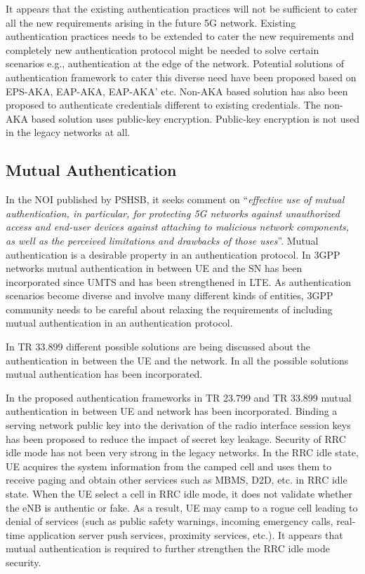 \documentclass[12pt]{llncs}
\newcommand\ques[1]{``\emph{#1}''}
\begin{document}
It appears that the existing authentication practices will not be sufficient to cater all the new requirements arising in the future 5G network. Existing authentication practices needs to be extended to cater the new requirements and completely new authentication protocol might be needed to solve certain scenarios e.g., authentication at the edge of the network. Potential solutions of authentication framework to cater this diverse need have been proposed based on EPS-AKA, EAP-AKA, EAP-AKA' etc. Non-AKA based solution has also been proposed to authenticate credentials different to existing credentials. The non-AKA based solution uses public-key encryption. Public-key encryption is not used in the legacy networks at all.  

\subsection{Mutual Authentication}
In the NOI published by PSHSB, it seeks comment on \ques{effective use of mutual authentication, in particular, for protecting 5G networks against unauthorized access and end-user devices against attaching to malicious network components, as well as the perceived limitations and drawbacks of those uses}. Mutual authentication is a desirable property in an authentication protocol. In 3GPP networks mutual authentication in between UE and the SN has been incorporated since UMTS and has been strengthened in LTE. As authentication scenarios become diverse and involve many different kinds of entities, 3GPP community needs to be careful about relaxing the requirements of including mutual authentication in an authentication protocol. 

In TR 33.899 different possible solutions are being discussed about the authentication in between the UE and the network. In all the possible solutions mutual authentication has been incorporated. 

In the proposed authentication frameworks in TR 23.799 and TR 33.899 mutual authentication in between UE and network has been incorporated. Binding a serving network public key into the derivation of the radio interface session keys has been proposed to reduce the impact of secret key leakage. Security of RRC idle mode has not been very strong in the legacy networks. In the RRC idle state, UE acquires the system information from the camped cell and uses them to receive paging and obtain other services such as MBMS, D2D, etc. in RRC idle state. When the UE select a cell in RRC idle mode, it does not validate whether the eNB is authentic or fake. As a result, UE may camp to a rogue cell leading to denial of services (such as public safety warnings, incoming emergency calls, real-time application server push services, proximity services, etc.).  It appears that mutual authentication is required to further strengthen the RRC idle mode security.
\end{document}

